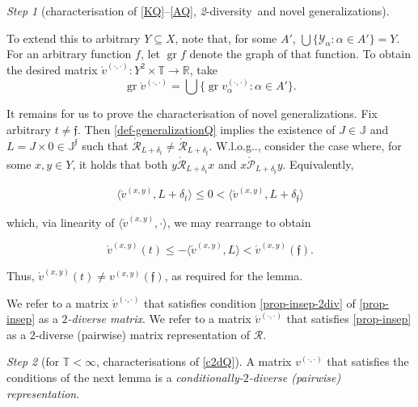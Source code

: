 \documentclass[ecta,nameyear,draft]{econsocart}
\makeatletter
\newcommand{\R}{\mathbb R}
\newcommand{\mc}{\mathcal}
\newcommand{\novel}{\mathfrak f}
\newcommand{\ext}{\mathrel{\mc R}}
\newcommand{\aext}{\mathrel{\acute{\mathrel{\mathcal R}}}}
\newcommand{\asext}{\mathrel{\acute{\mathrel{\mathcal P}}}}
\newcommand{\aextb}{\mathbin{\acute{\mathbin{\mathcal R}}}}
\newcommand{\mbbt}{{\mathds {T}}}
\newcommand{\mbbj}{\mathds J}
\newcommand{\mbbjp}{{\mathds {J}^{\novel}}}
\newcommand{\xy}{{(x, y)}}
\newcommand{\dd}{{(\cdot,\cdot)}}
\newcommand{\twodiv}{\textit{2}-\textup{diversity}}
\DeclareMathOperator{\graph}{gr}
\newcommand\Wlog{W\@.l\@.o\@.g\@ifnextchar.{}{.\@}}
\theoremstyle{plain}
\theoremstyle{remark}
\newtheorem{step}{Step}[section]
\makeatother
\begin{document}
\begin{appendix}
\begin{step}[characterisation of \ref{KQ}–\ref{AQ}, \twodiv\ and novel
    {generalization}s]
\begin{proofEnd}
    To extend this to arbitrary $Y \subseteq X$, note that, for some $A'$,
    $\bigcup\{\mc Y_\alpha : \alpha \in A' \} = Y$. For an arbitrary function
    $f$, let $\graph f$ denote the graph of that function. To obtain the
    desired matrix $\acute{v}^{\dd}: Y^2 \times \mbbt \rightarrow \R$, take
    \begin{equation}
      \graph \acute{v}^{\dd} = \bigcup \{\graph v^{\dd}_{\alpha} : \alpha \in
      A'\}.
    \end{equation}
  
    It remains for us to prove the characterisation of novel {generalization}s.
    Fix arbitrary $t \neq \novel$.  Then \cref{def-generalizationQ} implies
    the existence of $J \in \mbbj$ and $L = J \times 0 \in \mbbjp$ such that
    $\aextb _ {L + \delta_{t}} \neq \aextb _ {L + \delta_{\novel}}$.  \Wlog,
    consider the case where, for some $x , y \in Y$, it holds that both $y
    \aext _ {L + \delta _ t} x$ and $x \asext _ {L + \delta_ \novel} y $.
    Equivalently,
    \begin{linenomath*}
      \begin{equation*}
        \langle \acute{v}^{\xy}, L + \delta_ t \rangle \leq 0 < \langle
        \acute{v}^{\xy}, L + \delta_ \novel\rangle
      \end{equation*}
    \end{linenomath*}
    which, via linearity of $\langle \acute{v}^{\xy}, \cdot \rangle$, we may
    rearrange to obtain
    \begin{linenomath*}
      \begin{equation}\label{eq-nov}
        \acute{v}^{\xy} ( t ) \leq -\langle \acute{v}^{\xy}, L \rangle <
        \acute{v}^\xy ( \novel ) .
      \end{equation}
    \end{linenomath*}
    Thus, $\acute{v}^{\xy} (t) \neq v^{\xy}(\novel)$, as required for the
    lemma.
  \end{proofEnd}
  We refer to a matrix $\acute{v}^{\dd}$ that satisfies condition
  \ref{prop-insep-2div} of \cref{prop-insep} as a \emph{$2$-diverse matrix}. We
  refer to a matrix $\acute{v}^{\dd}$ that satisfies \cref{prop-insep} as a
  $2$-diverse (pairwise) matrix representation of $\ext$.
  \end{step}
  \begin{step}[for $\mbbt<\infty$, characterisations of
    \ref{c2dQ}]\label{step-condtwodiv}
    A matrix $v^{\dd}$ that satisfies the conditions of the next lemma is a
    \emph{conditionally-$2$-diverse (pairwise) representation}.
  

\end{step}
\end{appendix}
\end{document}
